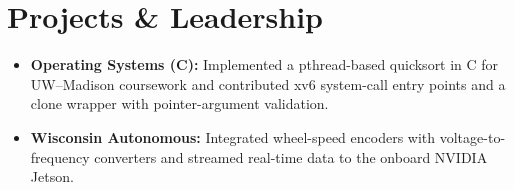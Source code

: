 \documentclass[11pt, letterpaper]{article}
\begin{document}
\section{Projects \& Leadership}
\begin{itemize}
  \item \textbf{Operating Systems (C):} Implemented a pthread-based quicksort in C for UW--Madison coursework and contributed xv6 system-call entry points and a clone wrapper with pointer-argument validation.
  \item \textbf{Wisconsin Autonomous:} Integrated wheel-speed encoders with voltage-to-frequency converters and streamed real-time data to the onboard NVIDIA Jetson.
\end{itemize}
\end{document}
